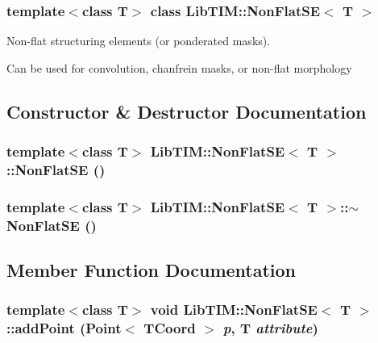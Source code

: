 \subsubsection*{template$<$class T$>$ class Lib\-TIM::Non\-Flat\-SE$<$ T $>$}

Non-flat structuring elements (or ponderated masks). 

Can be used for convolution, chanfrein masks, or non-flat morphology



\subsection{Constructor \& Destructor Documentation}
\subsubsection{\setlength{\rightskip}{0pt plus 5cm}template$<$class T$>$ {\bf Lib\-TIM::Non\-Flat\-SE}$<$ T $>$::{\bf Non\-Flat\-SE} ()\hspace{0.3cm}{\tt  [inline]}}\label{classLibTIM_1_1NonFlatSE_a0}


\subsubsection{\setlength{\rightskip}{0pt plus 5cm}template$<$class T$>$ {\bf Lib\-TIM::Non\-Flat\-SE}$<$ T $>$::$\sim${\bf Non\-Flat\-SE} ()\hspace{0.3cm}{\tt  [inline]}}\label{classLibTIM_1_1NonFlatSE_a1}




\subsection{Member Function Documentation}
\subsubsection{\setlength{\rightskip}{0pt plus 5cm}template$<$class T$>$ void {\bf Lib\-TIM::Non\-Flat\-SE}$<$ T $>$::add\-Point ({\bf Point}$<$ {\bf TCoord} $>$ {\em p}, T {\em attribute})\hspace{0.3cm}{\tt  [inline]}}\label{classLibTIM_1_1NonFlatSE_a7}


